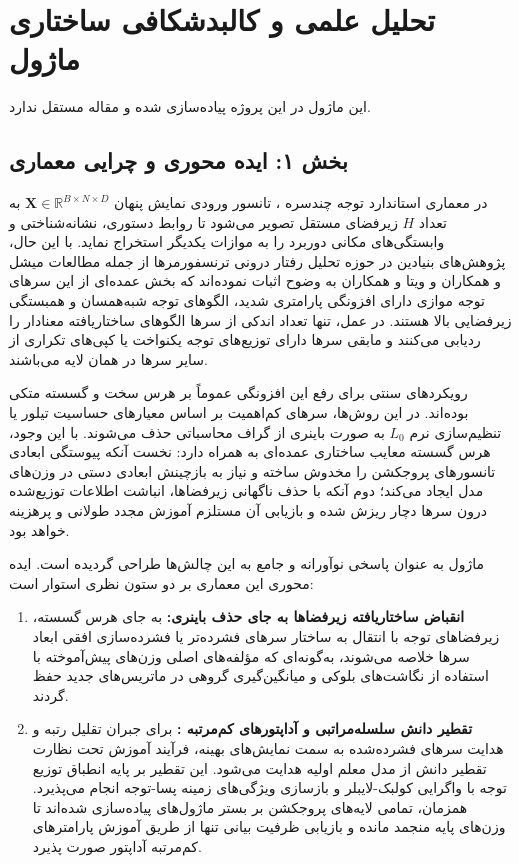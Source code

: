 \section{تحلیل علمی و کالبدشکافی ساختاری ماژول }

این ماژول در این پروژه پیاده‌سازی شده و مقاله مستقل ندارد.
\label{sec:squeezing_heads_distiller}

\subsection*{بخش ۱: ایده محوری و چرایی معماری }
در معماری استاندارد توجه چندسره ، تانسور ورودی نمایش پنهان $\mathbf{X} \in \mathbb{R}^{B \times N \times D}$ به تعداد $H$ زیرفضای مستقل تصویر می‌شود تا روابط دستوری، نشانه‌شناختی و وابستگی‌های مکانی دوربرد را به موازات یکدیگر استخراج نماید. با این حال، پژوهش‌های بنیادین در حوزه تحلیل رفتار درونی ترنسفورمرها از جمله مطالعات میشل و همکاران  و ویتا و همکاران  به وضوح اثبات نموده‌اند که بخش عمده‌ای از این سرهای توجه موازی دارای افزونگی پارامتری شدید، الگوهای توجه شبه‌همسان و همبستگی زیرفضایی بالا هستند. در عمل، تنها تعداد اندکی از سرها الگوهای ساختاریافته معنادار را ردیابی می‌کنند و مابقی سرها دارای توزیع‌های توجه یکنواخت یا کپی‌های تکراری از سایر سرها در همان لایه می‌باشند.

رویکردهای سنتی برای رفع این افزونگی عموماً بر هرس سخت و گسسته  متکی بوده‌اند. در این روش‌ها، سرهای کم‌اهمیت بر اساس معیارهای حساسیت تیلور یا تنظیم‌سازی نرم $L_0$ به صورت باینری از گراف محاسباتی حذف می‌شوند. با این وجود، هرس گسسته معایب ساختاری عمده‌ای به همراه دارد: نخست آنکه پیوستگی ابعادی تانسورهای پروجکشن را مخدوش ساخته و نیاز به بازچینش ابعادی دستی در وزن‌های مدل ایجاد می‌کند؛ دوم آنکه با حذف ناگهانی زیرفضاها، انباشت اطلاعات توزیع‌شده درون سرها دچار ریزش شده و بازیابی آن مستلزم آموزش مجدد طولانی و پرهزینه خواهد بود.

ماژول  به عنوان پاسخی نوآورانه و جامع به این چالش‌ها طراحی گردیده است. ایده محوری این معماری بر دو ستون نظری استوار است:
\begin{enumerate}
    \item \textbf{انقباض ساختاریافته زیرفضاها به جای حذف باینری:} به جای هرس گسسته، زیرفضاهای توجه با انتقال به ساختار سرهای فشرده‌تر  یا فشرده‌سازی افقی ابعاد سرها خلاصه می‌شوند، به‌گونه‌ای که مؤلفه‌های اصلی وزن‌های پیش‌آموخته با استفاده از نگاشت‌های بلوکی و میانگین‌گیری گروهی  در ماتریس‌های جدید حفظ گردند.
    \item \textbf{تقطیر دانش سلسله‌مراتبی و آداپتورهای کم‌مرتبه :} برای جبران تقلیل رتبه و هدایت سرهای فشرده‌شده به سمت نمایش‌های بهینه، فرآیند آموزش تحت نظارت تقطیر دانش از مدل معلم اولیه هدایت می‌شود. این تقطیر بر پایه انطباق توزیع توجه با واگرایی کولبک-لایبلر  و بازسازی ویژگی‌های زمینه پسا-توجه انجام می‌پذیرد. همزمان، تمامی لایه‌های پروجکشن بر بستر ماژول‌های  پیاده‌سازی شده‌اند تا وزن‌های پایه منجمد  مانده و بازیابی ظرفیت بیانی تنها از طریق آموزش پارامترهای کم‌مرتبه آداپتور صورت پذیرد.
\end{enumerate}

